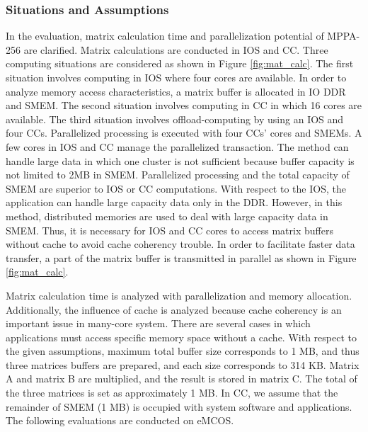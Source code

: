 \documentclass{sig-alternate-05-2015}
\begin{document}
\subsubsection{Situations and Assumptions}
\label{sec:situations_and_assumptions}
In the evaluation, matrix calculation time and parallelization potential of MPPA-256 are clarified.
Matrix calculations are conducted in IOS and CC.
Three computing situations are considered as shown in Figure \ref{fig:mat_calc}.
The first situation involves computing in IOS where four cores are available.
In order to analyze memory access characteristics, a matrix buffer is allocated in IO DDR and SMEM.
The second situation involves computing in CC in which 16 cores are available.
The third situation involves offload-computing by using an IOS and four CCs.
Parallelized processing is executed with four CCs' cores and SMEMs.
A few cores in IOS and CC manage the parallelized transaction.
The method can handle large data in which one cluster is not
sufficient because buffer capacity is not limited to 2MB in SMEM.
Parallelized processing and the total capacity of SMEM are superior to IOS or CC computations. 
With respect to the IOS, the application can handle large capacity data only in the DDR.
However, in this method, distributed memories are used to deal with large capacity data in SMEM.
Thus, it is necessary for IOS and CC cores to access matrix buffers without cache to avoid cache coherency trouble.
In order to facilitate faster data transfer, a part of the matrix buffer is transmitted in parallel as shown in Figure \ref{fig:mat_calc}.

Matrix calculation time is analyzed with parallelization and memory allocation.
Additionally, the influence of cache is analyzed because cache coherency is an important issue in many-core system.
There are several cases in which applications must access specific memory space without a cache.
With respect to the given assumptions, maximum total buffer size corresponds to 1 MB, and thus three matrices buffers are prepared, and each size corresponds to 314 KB.
Matrix A and matrix B are multiplied, and the result is stored in matrix C.
The total of the three matrices is set as approximately 1 MB.
In CC, we assume that the remainder of SMEM (1 MB) is occupied with system software and applications.
The following evaluations are conducted on eMCOS.
\end{document}

